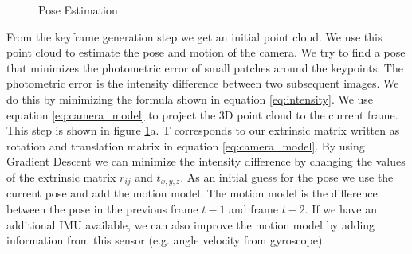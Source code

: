 \documentclass[11pt,a4paper,titlepage,oneside]{report}
\begin{document}
\begin{figure}
	\caption{Pose Estimation \cite{svo}}\label{fig:pose_estimation}
\end{figure}


From the keyframe generation step we get an initial point cloud. We use this point cloud to estimate the pose and motion of the camera. We try to find a pose that minimizes the photometric error of small patches around the keypoints. The photometric error is the intensity difference between two subsequent images. We do this by minimizing the formula shown in equation \ref{eq:intensity}. We use equation \ref{eq:camera_model} to project the 3D point cloud to the current frame. This step is shown in figure \ref{fig:pose_estimation}a. T corresponds to our extrinsic matrix written as rotation and translation matrix in equation \ref{eq:camera_model}. By using Gradient Descent we can minimize the intensity difference by changing the values of the extrinsic matrix $r_{ij}$ and $t_{x,y,z}$. As an initial guess for the pose we use the current pose and add the motion model. The motion model is the difference between the pose in the previous frame $t-1$ and frame $t-2$. If we have an additional IMU available, we can also improve the motion model by adding information from this sensor (e.g. angle velocity from gyroscope).
\end{document}
